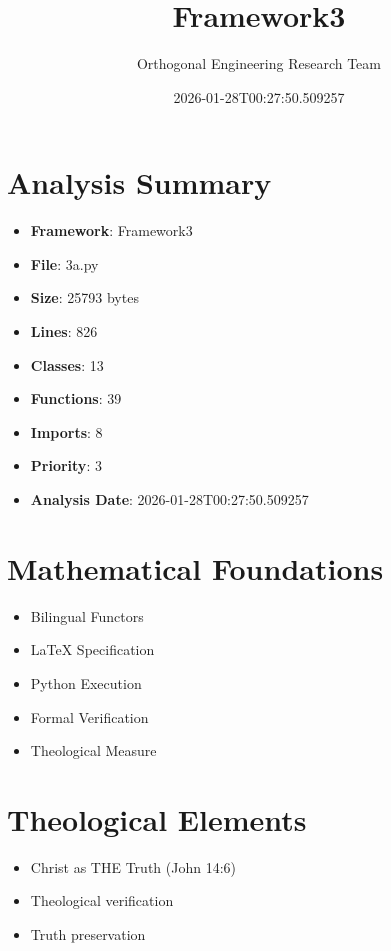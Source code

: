 \documentclass[12pt]{article}
\title{Framework3}
\author{Orthogonal Engineering Research Team}
\date{2026-01-28T00:27:50.509257}
\begin{document}
\maketitle

\section{Analysis Summary}

\begin{itemize}
    \item \textbf{Framework}: Framework3
    \item \textbf{File}: 3a.py
    \item \textbf{Size}: 25793 bytes
    \item \textbf{Lines}: 826
    \item \textbf{Classes}: 13
    \item \textbf{Functions}: 39
    \item \textbf{Imports}: 8
    \item \textbf{Priority}: 3
    \item \textbf{Analysis Date}: 2026-01-28T00:27:50.509257
\end{itemize}

\section{Mathematical Foundations}

\begin{itemize}
    \item Bilingual Functors
    \item LaTeX Specification
    \item Python Execution
    \item Formal Verification
    \item Theological Measure
\end{itemize}

\section{Theological Elements}

\begin{itemize}
    \item Christ as THE Truth (John 14:6)
    \item Theological verification
    \item Truth preservation
\end{itemize}
\end{document}
